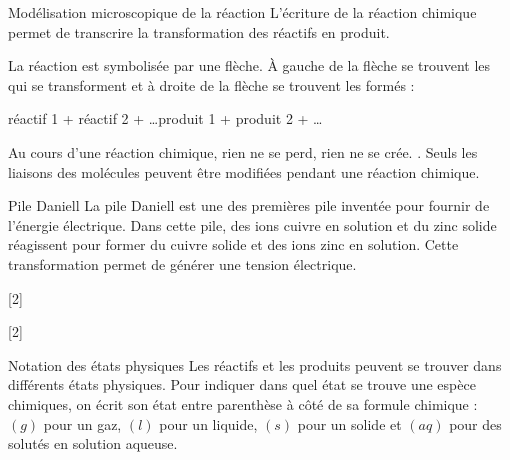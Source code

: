 \begin{doc}{Modélisation microscopique de la réaction}
  L'écriture de la réaction chimique permet de transcrire la transformation des réactifs en produit.
  
  \begin{importants}
    La réaction est symbolisée par une flèche. À gauche de la flèche se trouvent les  qui se transforment et à droite de la flèche se trouvent les  formés :
    \begin{center}
      réactif 1 + réactif 2 + \ldots \reaction produit 1 + produit 2 + \ldots
    \end{center}
  \end{importants}
  
  Au cours d'une réaction chimique, rien ne se perd, rien ne se crée. .
  Seuls les liaisons des molécules peuvent être modifiées pendant une réaction chimique.
\end{doc}

\begin{doc}{Pile Daniell}
  La pile Daniell est une des premières pile inventée pour fournir de l'énergie électrique.
  Dans cette pile, des ions cuivre  en solution et du zinc solide  réagissent pour former du cuivre solide  et des ions zinc  en solution.
  Cette transformation permet de générer une tension électrique.
\end{doc}

\newpage
\vspace*{-30pt}
[2]

[2]


\begin{doc}{Notation des états physiques}
  Les réactifs et les produits peuvent se trouver dans différents états physiques.
  Pour indiquer dans quel état se trouve une espèce chimiques, on écrit son état entre parenthèse à côté de sa formule chimique : $(g)$ pour un gaz, $(l)$ pour un liquide, $(s)$ pour un solide et $(aq)$ pour des solutés en solution aqueuse.
\end{doc}

